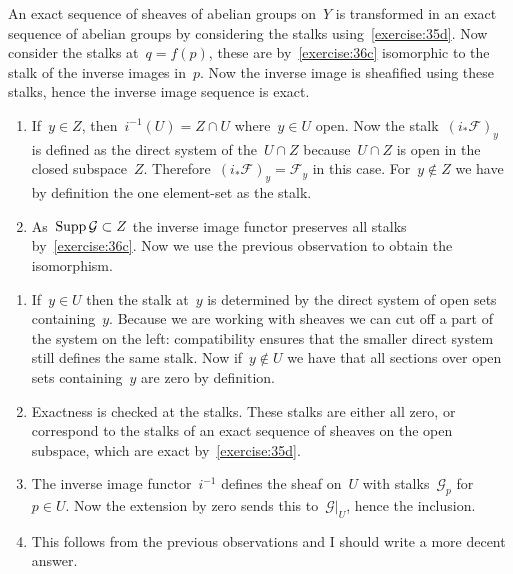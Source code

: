 \begin{exercise}
  An exact sequence of sheaves of abelian groups on~$Y$ is transformed in an exact sequence of abelian groups by considering the stalks using~\autoref{exercise:35d}. Now consider the stalks at~$q=f(p)$, these are by~\autoref{exercise:36c} isomorphic to the stalk of the inverse images in~$p$. Now the inverse image is sheafified using these stalks, hence the inverse image sequence is exact.
\end{exercise}

\begin{exercise}
  \begin{enumerate}
    \item If~$y\in Z$, then~$i^{-1}(U)=Z\cap U$ where~$y\in U$ open. Now the stalk~$(i_*\mathcal{F})_y$ is defined as the direct system of the~$U\cap Z$ because~$U\cap Z$ is open in the closed subspace~$Z$. Therefore~$(i_*\mathcal{F})_y=\mathcal{F}_y$ in this case. For~$y\notin Z$ we have by definition the one element-set as the stalk.

    \item As~$\operatorname{Supp}\mathcal{G}\subset Z$ the inverse image functor preserves all stalks by~\autoref{exercise:36c}. Now we use the previous observation to obtain the isomorphism.
  \end{enumerate}
\end{exercise}

\begin{exercise}
  \begin{enumerate}
    \item If~$y\in U$ then the stalk at~$y$ is determined by the direct system of open sets containing~$y$. Because we are working with sheaves we can cut off a part of the system on the left: compatibility ensures that the smaller direct system still defines the same stalk. Now if~$y\notin U$ we have that all sections over open sets containing~$y$ are zero by definition.

    \item Exactness is checked at the stalks. These stalks are either all zero, or correspond to the stalks of an exact sequence of sheaves on the open subspace, which are exact by~\autoref{exercise:35d}.

    \item The inverse image functor~$i^{-1}$ defines the sheaf on~$U$ with stalks~$\mathcal{G}_p$ for~$p\in U$. Now the extension by zero sends this to~$\mathcal{G}|_U$, hence the inclusion.

    \item This follows from the previous observations and I should write a more decent answer.
  \end{enumerate}
\end{exercise}



